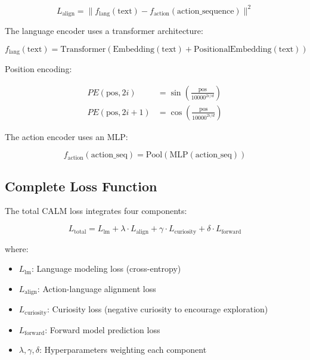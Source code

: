 \documentclass{IEEEtran}
\begin{document}
\begin{equation}
L_{\text{align}} = \|f_{\text{lang}}(\text{text}) - f_{\text{action}}(\text{action\_sequence})\|^2
\end{equation}

The language encoder uses a transformer architecture:

\begin{equation}
f_{\text{lang}}(\text{text}) = \text{Transformer}(\text{Embedding}(\text{text}) + \text{PositionalEmbedding}(\text{text}))
\end{equation}

Position encoding:

\begin{align}
PE(\text{pos}, 2i) &= \sin\left(\frac{\text{pos}}{10000^{2i/d}}\right) \\
PE(\text{pos}, 2i+1) &= \cos\left(\frac{\text{pos}}{10000^{2i/d}}\right)
\end{align}

The action encoder uses an MLP:

\begin{equation}
f_{\text{action}}(\text{action\_seq}) = \text{Pool}(\text{MLP}(\text{action\_seq}))
\end{equation}

\subsection{Complete Loss Function}

The total CALM loss integrates four components:

\begin{equation}
L_{\text{total}} = L_{\text{lm}} + \lambda \cdot L_{\text{align}} + \gamma \cdot L_{\text{curiosity}} + \delta \cdot L_{\text{forward}}
\end{equation}

where:
\begin{itemize}
    \item $L_{\text{lm}}$: Language modeling loss (cross-entropy)
    \item $L_{\text{align}}$: Action-language alignment loss
    \item $L_{\text{curiosity}}$: Curiosity loss (negative curiosity to encourage exploration)
    \item $L_{\text{forward}}$: Forward model prediction loss
    \item $\lambda, \gamma, \delta$: Hyperparameters weighting each component
\end{itemize}
\end{document}
